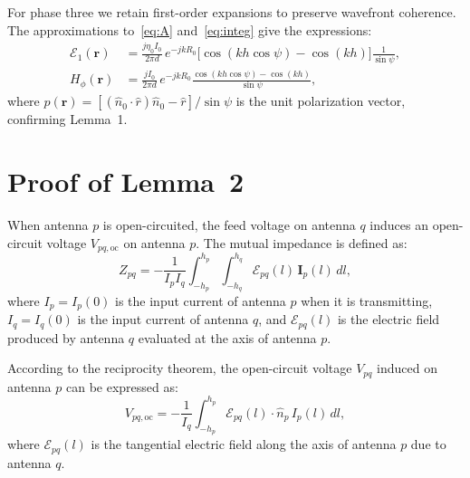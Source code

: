 \documentclass[journal]{IEEEtran}
\begin{document}
For phase three we retain first-order expansions to preserve wavefront coherence. The approximations to~\eqref{eq:A} and~\eqref{eq:integ} give the expressions:
\begin{align}
    \mathcal{E}_1(\mathbf{r}) &= \frac{j\eta_0 I_0}{2\pi d}\,e^{-jkR_0}
    \bigl[\cos(kh\cos\psi) - \cos(kh)\bigr]\frac{1}{\sin\psi},\label{eq:E1}\\
    H_\phi(\mathbf{r}) &= \frac{jI_0}{2\pi d}\,e^{-jkR_0}\frac{\cos(kh\cos\psi) - \cos(kh)}{\sin\psi},\label{eq:Hphi}
\end{align}
where $p(\mathbf{r}) = [(\hat{n}_0 \cdot \hat{r})\hat{n}_0 - \hat{r}]/\sin\psi$ is the unit polarization vector, confirming Lemma~1.


\appendices
\section{Proof of Lemma~2}
\label{app:lemma2}

When antenna $p$ is open-circuited, the feed voltage on antenna $q$ induces an open-circuit voltage $V_{pq,\mathrm{oc}}$ on antenna $p$. The mutual impedance is defined as:
\begin{equation}
    Z_{pq} = -\frac{1}{I_p I_q}\int_{-h_p}^{h_p}\int_{-h_q}^{h_q}
    \mathcal{E}_{pq}(l)\,\mathbf{I}_p(l)\,dl,
    \label{eq:Zpq}
\end{equation}
where $I_p = I_p(0)$ is the input current of antenna $p$ when it is transmitting, $I_q = I_q(0)$ is the input current of antenna $q$, and $\mathcal{E}_{pq}(l)$ is the electric field produced by antenna $q$ evaluated at the axis of antenna $p$.

According to the reciprocity theorem, the open-circuit voltage $V_{pq}$ induced on antenna $p$ can be expressed as:
\begin{equation}
    V_{pq,\mathrm{oc}} = -\frac{1}{I_q}\int_{-h_p}^{h_p}
    \mathcal{E}_{pq}(l)\cdot\hat{n}_p\,I_p(l)\,dl,
    \label{eq:Vpc}
\end{equation}
where $\mathcal{E}_{pq}(l)$ is the tangential electric field along the axis of antenna $p$ due to antenna $q$.
\end{document}
